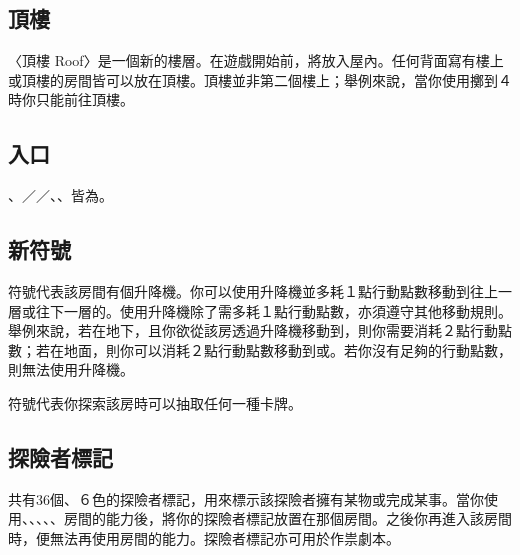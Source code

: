
\subsection{頂樓}

〈頂樓 Roof〉是一個新的樓層。在遊戲開始前，將放入屋內。任何背面寫有樓上或頂樓的房間皆可以放在頂樓。頂樓並非第二個樓上；舉例來說，當你使用擲到４時你只能前往頂樓。


\subsection{入口}

、／／、、皆為。


\subsection{新符號}

\DumbwaiterSymbol{}符號代表該房間有個升降機。你可以使用升降機並多耗１點行動點數移動到往上一層或往下一層的。使用升降機除了需多耗１點行動點數，亦須遵守其他移動規則。舉例來說，若在地下，且你欲從該房透過升降機移動到，則你需要消耗２點行動點數；若在地面，則你可以消耗２點行動點數移動到或。若你沒有足夠的行動點數，則無法使用升降機。

\QuestionSymbol{}符號代表你探索該房時可以抽取任何一種卡牌。


\subsection{探險者標記}

共有36個、６色的探險者標記，用來標示該探險者擁有某物或完成某事。當你使用、、、、、房間的能力後，將你的探險者標記放置在那個房間。之後你再進入該房間時，便無法再使用房間的能力。探險者標記亦可用於作祟劇本。

